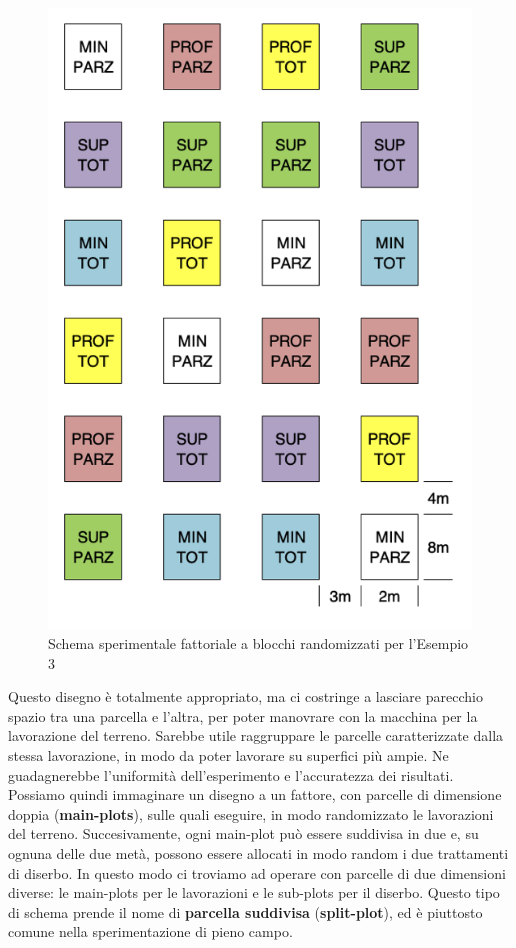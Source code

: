 \documentclass[a4paper,12pt,oneside]{book}
\theoremstyle{definition}
\theoremstyle{definition}
\theoremstyle{definition}
\theoremstyle{remark}
\begin{document}
\begin{figure}

{\centering \includegraphics[width=0.65\linewidth]{_images/Mappa3FATT} 

}

\caption{Schema sperimentale fattoriale a blocchi randomizzati per l'Esempio 3}\label{fig:figName36}
\end{figure}

Questo disegno è totalmente appropriato, ma ci costringe a lasciare
parecchio spazio tra una parcella e l'altra, per poter manovrare con la
macchina per la lavorazione del terreno. Sarebbe utile raggruppare le
parcelle caratterizzate dalla stessa lavorazione, in modo da poter
lavorare su superfici più ampie. Ne guadagnerebbe l'uniformità
dell'esperimento e l'accuratezza dei risultati. Possiamo quindi
immaginare un disegno a un fattore, con parcelle di dimensione doppia
(\textbf{main-plots}), sulle quali eseguire, in modo randomizzato le
lavorazioni del terreno. Succesivamente, ogni main-plot può essere
suddivisa in due e, su ognuna delle due metà, possono essere allocati in
modo random i due trattamenti di diserbo. In questo modo ci troviamo ad
operare con parcelle di due dimensioni diverse: le main-plots per le
lavorazioni e le sub-plots per il diserbo. Questo tipo di schema prende
il nome di \textbf{parcella suddivisa} (\textbf{split-plot}), ed è
piuttosto comune nella sperimentazione di pieno campo.
\end{document}
